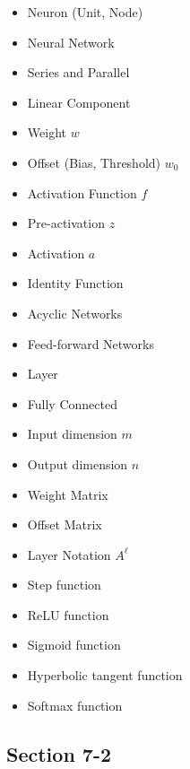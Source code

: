     \begin{itemize}
        \item Neuron (Unit, Node)
        \item Neural Network
        \item Series and Parallel
        \item Linear Component
        \item Weight $w$
        \item Offset (Bias, Threshold) $w_0$
        \item Activation Function $f$
        \item Pre-activation $z$
        \item Activation $a$
        \item Identity Function
        \item Acyclic Networks
        \item Feed-forward Networks
        \item Layer
        \item Fully Connected
        \item Input dimension $m$
        \item Output dimension $n$
        \item Weight Matrix
        \item Offset Matrix
        \item Layer Notation $A^\ell$
        \item Step function
        \item ReLU function
        \item Sigmoid function
        \item Hyperbolic tangent function
        \item Softmax function
    \end{itemize}

    \subsection*{Section 7-2}

